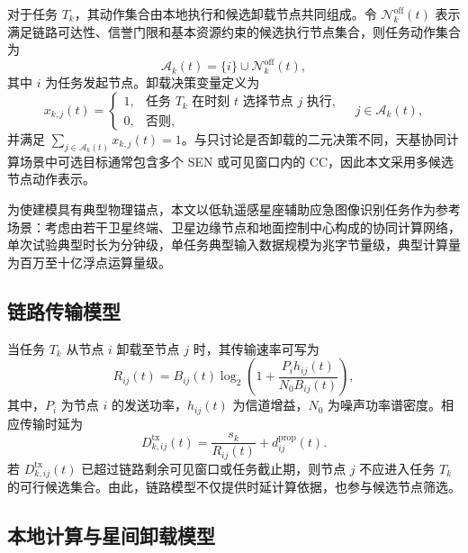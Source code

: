 对于任务 $T_k$，其动作集合由本地执行和候选卸载节点共同组成。令 $\mathcal{N}_k^{\mathrm{off}}(t)$ 表示满足链路可达性、信誉门限和基本资源约束的候选执行节点集合，则任务动作集合为
\begin{equation}
    \mathcal{A}_k(t)=\{i\}\cup\mathcal{N}_k^{\mathrm{off}}(t),
    \label{eq:ch3_task_action_set}
\end{equation}
其中 $i$ 为任务发起节点。卸载决策变量定义为
\begin{equation}
    x_{k,j}(t)=
    \begin{cases}
        1, & \text{任务 } T_k \text{ 在时刻 } t \text{ 选择节点 } j \text{ 执行}, \\
        0, & \text{否则},
    \end{cases}
    \quad j\in\mathcal{A}_k(t),
    \label{eq:ch3_offloading_decision}
\end{equation}
并满足 $\sum_{j\in\mathcal{A}_k(t)}x_{k,j}(t)=1$。与只讨论是否卸载的二元决策不同，天基协同计算场景中可选目标通常包含多个 SEN 或可见窗口内的 CC，因此本文采用多候选节点动作表示。

为使建模具有典型物理锚点，本文以低轨遥感星座辅助应急图像识别任务作为参考场景：考虑由若干卫星终端、卫星边缘节点和地面控制中心构成的协同计算网络，单次试验典型时长为分钟级，单任务典型输入数据规模为兆字节量级，典型计算量为百万至十亿浮点运算量级。

\subsection{链路传输模型}
\label{subsec:ch3_tx_model}

当任务 $T_k$ 从节点 $i$ 卸载至节点 $j$ 时，其传输速率可写为
\begin{equation}
    R_{ij}(t)=B_{ij}(t)\log_2\!\left(1+\frac{P_i h_{ij}(t)}{N_0 B_{ij}(t)}\right),
    \label{eq:ch3_rate_model}
\end{equation}
其中，$P_i$ 为节点 $i$ 的发送功率，$h_{ij}(t)$ 为信道增益，$N_0$ 为噪声功率谱密度。相应传输时延为
\begin{equation}
    D_{k,ij}^{\mathrm{tx}}(t)=\frac{s_k}{R_{ij}(t)}+d_{ij}^{\mathrm{prop}}(t).
    \label{eq:ch3_tx_delay}
\end{equation}
若 $D_{k,ij}^{\mathrm{tx}}(t)$ 已超过链路剩余可见窗口或任务截止期，则节点 $j$ 不应进入任务 $T_k$ 的可行候选集合。由此，链路模型不仅提供时延计算依据，也参与候选节点筛选。

\subsection{本地计算与星间卸载模型}
\label{subsec:ch3_exec_model}

